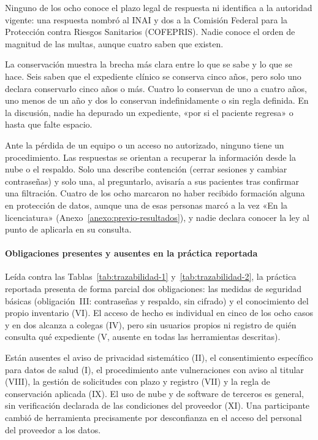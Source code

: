 \documentclass[12pt, a4paper]{article}
\begin{document}
Ninguno de los ocho conoce el plazo legal de respuesta ni identifica a
la autoridad vigente: una respuesta nombró al INAI y dos a la Comisión
Federal para la Protección contra Riesgos Sanitarios (COFEPRIS). Nadie
conoce el orden de magnitud de las multas, aunque cuatro saben que
existen.

La conservación muestra la brecha más clara entre lo que se sabe y lo
que se hace. Seis saben que el expediente clínico se conserva cinco
años, pero solo uno declara conservarlo cinco años o más. Cuatro lo
conservan de uno a cuatro años, uno menos de un año y dos lo conservan
indefinidamente o sin regla definida. En la discusión, nadie ha depurado
un expediente, «por si el paciente regresa» o hasta que falte espacio.

Ante la pérdida de un equipo o un acceso no autorizado, ninguno tiene un
procedimiento. Las respuestas se orientan a recuperar la información
desde la nube o el respaldo. Solo una describe contención (cerrar
sesiones y cambiar contraseñas) y solo una, al preguntarlo, avisaría a
sus pacientes tras confirmar una filtración. Cuatro de los ocho marcaron
no haber recibido formación alguna en protección de datos, aunque una
de esas personas marcó a la vez «En la licenciatura»
(Anexo~\ref{anexo:previo-resultados}), y nadie declara conocer la ley al
punto de aplicarla en su consulta.
 
\paragraph{Obligaciones presentes y ausentes en la práctica reportada}
Leída contra las Tablas~\ref{tab:trazabilidad-1}
y~\ref{tab:trazabilidad-2}, la práctica reportada presenta de forma
parcial dos obligaciones: las medidas de seguridad básicas
(obligación~III: contraseñas y respaldo, sin cifrado) y el conocimiento
del propio inventario (VI). El acceso de hecho es individual en cinco de
los ocho casos y en dos alcanza a colegas (IV), pero
sin usuarios propios ni registro de quién consulta qué expediente (V,
ausente en todas las herramientas descritas).

Están ausentes el aviso de privacidad sistemático (II), el
consentimiento específico para datos de salud (I), el procedimiento ante
vulneraciones con aviso al titular (VIII), la gestión de solicitudes con
plazo y registro (VII) y la regla de conservación aplicada (IX). El uso
de nube y de software de terceros es general, sin verificación declarada
de las condiciones del proveedor (XI). Una participante cambió de
herramienta precisamente por desconfianza en el acceso del personal del
proveedor a los datos.
\end{document}
